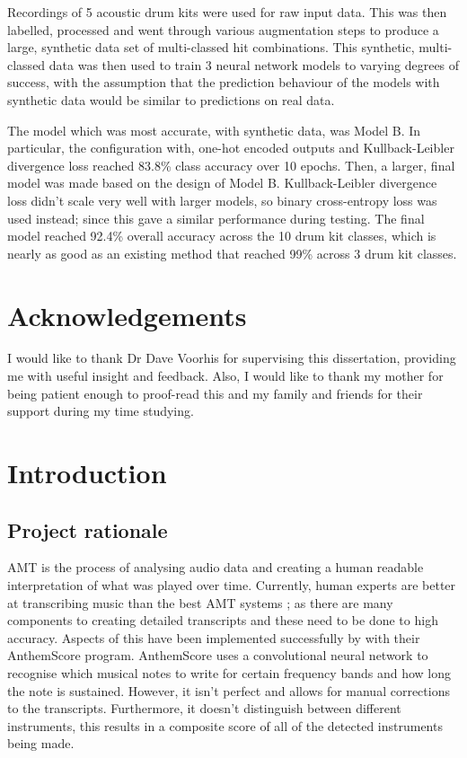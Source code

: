 \documentclass[12pt]{article}
\begin{document}
	Recordings of 5 acoustic drum kits were used for raw input data. This was then labelled, processed and went through various augmentation steps to produce a large, synthetic data set of multi-classed hit combinations. This synthetic, multi-classed data was then used to train 3 neural network models to varying degrees of success, with the assumption that the prediction behaviour of the models with synthetic data would be similar to predictions on real data.\medskip
	
	The model which was most accurate, with synthetic data, was Model B. In particular, the configuration with, one-hot encoded outputs and Kullback-Leibler divergence loss reached 83.8\% class accuracy over 10 epochs. Then, a larger, final model was made based on the design of Model B. Kullback-Leibler divergence loss didn't scale very well with larger models, so binary cross-entropy loss was used instead; since this gave a similar performance during testing. The final model reached 92.4\% overall accuracy across the 10 drum kit classes, which is nearly as good as an existing method that reached 99\% across 3 drum kit classes. 
	\newpage
	
	\section*{Acknowledgements}
	I would like to thank Dr Dave Voorhis for supervising this dissertation, providing me with useful insight and feedback. Also, I would like to thank my mother for being patient enough to proof-read this and my family and friends for their support during my time studying.
	\newpage
	
	\tableofcontents
	
	\newpage
	\pagestyle{fancy}
	\section{Introduction}
	\subsection{Project rationale}
	AMT is the process of analysing audio data and creating a human readable interpretation of what was played over time. Currently, human experts are better at transcribing music than the best AMT systems \parencite{Benetos}; as there are many components to creating detailed transcripts and these need to be done to high accuracy. Aspects of this have been implemented successfully by \textcite{lunaverus} with their AnthemScore program. AnthemScore uses a convolutional neural network to recognise which musical notes to write for certain frequency bands and how long the note is sustained. However, it isn't perfect and allows for manual corrections to the transcripts. Furthermore, it doesn't distinguish between different instruments, this results in a composite score of all of the detected instruments being made.\medskip
	
\end{document}
